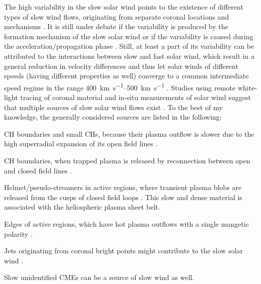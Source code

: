 The high variability in the slow solar wind points to the existence of different types of slow wind flows, originating from separate coronal locations and mechanisms \citep{Schwenn1983}. It is still under debate if the variability is produced by the formation mechanism of the slow solar wind or if the variability is caused during the acceleration/propagation phase \citep{Sanchez-Diaz2016}. Still, at least a part of its variability can be attributed to the interactions between slow and fast solar wind, which result in a general reduction in velocity differences and thus let solar winds of different speeds (having different properties as well) converge to a common intermediate speed regime in the range \SIrange{400}{500}{\km\per\s} \citep{McGregor2011a,Sanchez-Diaz2016}. Studies using remote white-light tracing of coronal material and in-situ measurements of solar wind suggest that multiple sources of slow solar wind flows exist \citep{Wang2000,Kilpua2016}. To the best of my knowledge, the generally considered sources are listed in the following:
\begin{itemize*}
	\item CH boundaries and small CHs, because their plasma outflow is slower due to the high superradial expansion of its open field lines \citep{Wang1990}.
	\item CH boundaries, when trapped plasma is released by reconnection between open and closed field lines \citep{Madjarska2004}.
	\item Helmet/pseudo-streamers in active regions, where transient plasma blobs are released from the cusps of closed field loops \citep{Wang1998,Wang2000}. This slow and dense material is associated with the heliospheric plasma sheet belt.
	\item Edges of active regions, which have hot plasma outflows with a single mangetic polarity \citep{Kojima1999}.
	\item Jets originating from coronal bright points might contribute to the slow solar wind \citep{Subramanian2010}.
	\item Slow unidentified CMEs can be a source of slow wind as well.
\end{itemize*}

